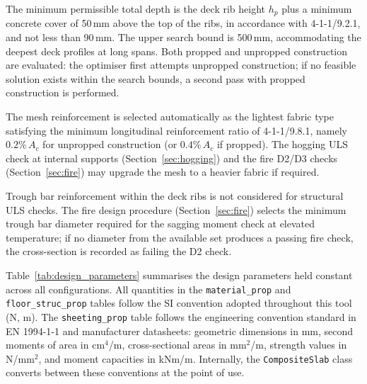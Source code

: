 The minimum permissible total depth is the deck rib height $h_p$ plus a minimum concrete cover of 50\,mm above the top of the ribs, in accordance with 4-1-1/9.2.1, and not less than 90\,mm. The upper search bound is 500\,mm, accommodating the deepest deck profiles at long spans. Both propped and unpropped construction are evaluated: the optimiser first attempts unpropped construction; if no feasible solution exists within the search bounds, a second pass with propped construction is performed.

The mesh reinforcement is selected automatically as the lightest fabric type satisfying the minimum longitudinal reinforcement ratio of 4-1-1/9.8.1, namely $0.2\%\,A_c$ for unpropped construction (or $0.4\%\,A_c$ if propped). The hogging ULS check at internal supports (Section~\ref{sec:hogging}) and the fire D2/D3 checks (Section~\ref{sec:fire}) may upgrade the mesh to a heavier fabric if required.

Trough bar reinforcement within the deck ribs is not considered for structural ULS checks. The fire design procedure (Section~\ref{sec:fire}) selects the minimum trough bar diameter required for the sagging moment check at elevated temperature; if no diameter from the available set produces a passing fire check, the cross-section is recorded as failing the D2 check.

Table~\ref{tab:design_parameters} summarises the design parameters held constant across all configurations. All quantities in the \texttt{material\_prop} and \texttt{floor\_struc\_prop} tables follow the SI convention adopted throughout this tool (N, m). The \texttt{sheeting\_prop} table follows the engineering convention standard in EN 1994-1-1 and manufacturer datasheets: geometric dimensions in mm, second moments of area in cm$^4$/m, cross-sectional areas in mm$^2$/m, strength values in N/mm$^2$, and moment capacities in kNm/m. Internally, the \texttt{CompositeSlab} class converts between these conventions at the point of use.

